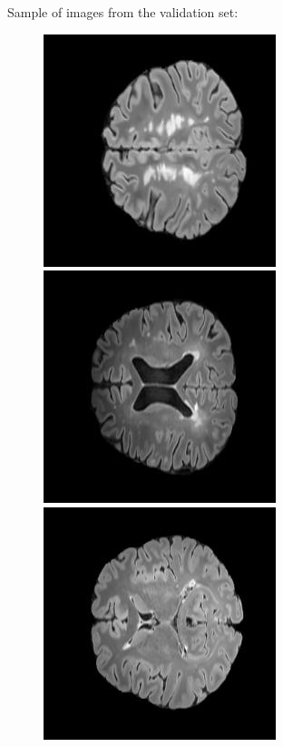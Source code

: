 \begin{figure}[!htb]
\end{figure}

Sample of images from the validation set: 
\begin{figure}[!htb]
    \includegraphics[width=.32\textwidth]{images/ts_images/ts175_input.jpg}\hfill
    \includegraphics[width=.32\textwidth]{images/ts_images/ts431_input.jpg}\hfill
    \includegraphics[width=.32\textwidth]{images/ts_images/ts687_input.jpg}
    \hfill

\end{figure}

